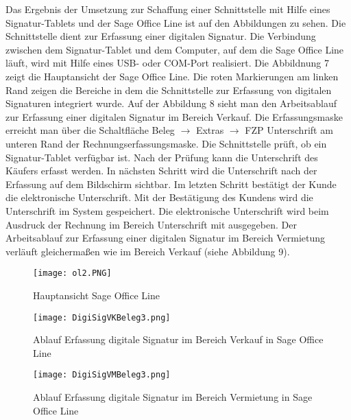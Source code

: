 Das Ergebnis der Umsetzung zur Schaffung einer Schnittstelle mit Hilfe eines Signatur-Tablets und der Sage Office Line ist auf den Abbildungen zu sehen. Die Schnittstelle dient zur Erfassung einer digitalen Signatur. Die Verbindung zwischen dem Signatur-Tablet und dem Computer, auf dem die Sage Office Line läuft, wird mit Hilfe eines USB- oder COM-Port realisiert. Die Abbildnung 7 zeigt die Hauptansicht der Sage Office Line. Die roten Markierungen am linken Rand zeigen die Bereiche in dem die Schnittstelle zur Erfassung von digitalen Signaturen integriert wurde. Auf der Abbildung 8 sieht man den Arbeitsablauf zur Erfassung einer digitalen Signatur im Bereich Verkauf. Die Erfassungsmaske erreicht man über die Schaltfläche Beleg $\rightarrow$ Extras $\rightarrow$ FZP Unterschrift am unteren Rand der Rechnungserfassungsmaske. Die Schnittstelle prüft, ob ein Signatur-Tablet verfügbar ist. Nach der Prüfung kann die Unterschrift des Käufers erfasst werden. In nächsten Schritt wird die Unterschrift nach der Erfassung auf dem Bildschirm sichtbar. Im letzten Schritt bestätigt der Kunde die elektronische Unterschrift. Mit der Bestätigung des Kundens wird die Unterschrift im System gespeichert. Die elektronische Unterschrift wird beim Ausdruck der Rechnung im Bereich Unterschrift mit ausgegeben. Der Arbeitsablauf zur Erfassung einer digitalen Signatur im Bereich Vermietung verläuft gleichermaßen wie im Bereich Verkauf (siehe Abbildung 9).

\begin{figure}[!ht]
    \centering
    \texttt{[image: ol2.PNG]}
    \caption[Hauptansicht Sage Office Line]{\small{Hauptansicht Sage Office Line}}
\end{figure}

\begin{figure}[!ht]
    \centering
    \texttt{[image: DigiSigVKBeleg3.png]}
    \caption[Ablauf Erfassung digitale Signatur in Sage Office Line (Verkauf)]{\small{Ablauf Erfassung digitale Signatur im Bereich Verkauf in Sage Office Line}}
\end{figure}

\begin{figure}[!ht]
    \centering
    \texttt{[image: DigiSigVMBeleg3.png]}
    \caption[Ablauf Erfassung digitale Signatur in Sage Office Line (Vermietung)]{\small{Ablauf Erfassung digitale Signatur im Bereich Vermietung in Sage Office Line}}
\end{figure}